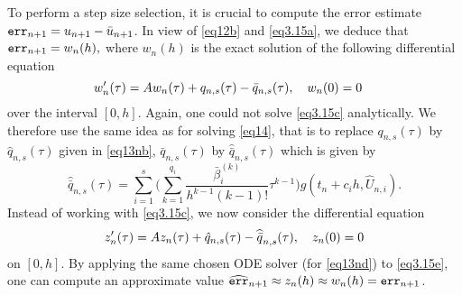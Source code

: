 To perform a step size selection, it is crucial to compute the error estimate ${\tt err}_{n+1}=u_{n+1}- \bar{u}_{n+1}$.
In view of \eqref{eq12b} and \eqref{eq3.15a}, we deduce that ${\tt err}_{n+1}=w_n(h),$ where $w_n(h)$ 
is the exact solution of the following differential equation
\begin{equation} \label{eq3.15c}
w'_n(\tau)=Aw_n(\tau) +  q_{n,s}(\tau)-\bar{q}_{n,s}(\tau), \q  w_n(0)=0 \q 
\end{equation}  
over the interval $[0,h]$. 
Again, one could not solve \eqref{eq3.15c} analytically.
We therefore use the same idea as for solving \eqref{eq14}, that is to replace $q_{n,s}(\tau)$ by $\hat{q}_{n,s}(\tau)$ given in \eqref{eq13nb}, $\bar{q}_{n,s}(\tau)$ by $\widehat{\bar{q}}_{n,s}(\tau)$ which is given by
\begin{equation}\label{eq3.15d}
\widehat{\bar{q}}_{n,s}(\tau) = \sum_{i=1}^{s} \Big(\sum_{k=1}^{q_i}\dfrac{\bar{\beta}^{(k)}_{i} }{h^{k-1}(k-1)!}\tau^{k-1} \Big) g(t_n +c_i h, \widehat{U}_{n,i}).  
\end{equation}
Instead of working with \eqref{eq3.15c}, we now consider the differential equation
\begin{equation} \label{eq3.15e}
z'_n(\tau)=Az_n(\tau) +  \hat{q}_{n,s}(\tau)-\widehat{\bar{q}}_{n,s}(\tau), \q  z_n(0)=0  
\end{equation} 
on $[0,h]$. By applying the same chosen ODE solver (for \eqref{eq13nd}) to \eqref{eq3.15e},
one can compute an approximate value $\widehat{{\tt err}}_{n+1}\approx z_n (h) \approx w_n (h)={\tt err}_{n+1}$. 

